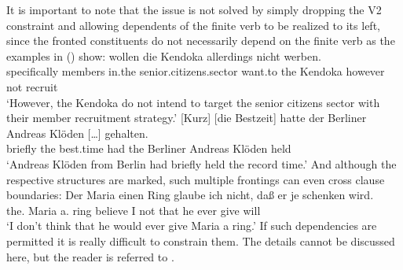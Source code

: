 It is important to note that the issue is not solved by simply dropping the V2 constraint and
allowing dependents of the finite verb to be realized to its left, since the fronted constituents do
not necessarily depend on the finite verb as the examples in () show:\pagebreak
\eal
\ex
\label{ex-mehrfach-vf-adv-acc}
\gll [Gezielt] [Mitglieder] [im     Seniorenbereich]       wollen  die Kendoka allerdings nicht werben.\footnotemark\\
    \spacebr{}specifically \spacebr{}members     \spacebr{}in.the senior.citizens.sector want.to the Kendoka however    not   recruit\\
\glt `However, the Kendoka do not intend to target the senior citizens sector with their member recruitment strategy.'%
\label{bsp-gezielt-mitglieder}
\ex 
\gll {}[Kurz] [die Bestzeit] hatte der Berliner Andreas Klöden [\ldots] gehalten.\footnotemark\\
	 \spacebr{}briefly \spacebr{}the best.time had the Berliner Andreas Klöden {} held\\
\label{bsp-kurz-die-bestzeit}     
\glt `Andreas Klöden from Berlin had briefly held the record time.'
\zl
And although the respective structures are marked, such multiple frontings can even cross clause boundaries:
\ea 
\gll Der        Maria einen    Ring glaube  ich nicht, daß  er je   schenken wird.\footnotemark\\
     the.\dat{} Maria a.\acc{} ring believe I   not    that he ever give     will\\
\glt `I don't think that he would ever give Maria a ring.'
\z
If such dependencies are permitted it is really difficult to constrain them. The details cannot be
discussed here, but the reader is referred to .

